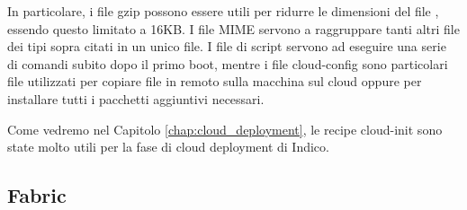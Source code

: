             In particolare, i file gzip possono essere utili per ridurre le dimensioni del file , essendo questo limitato a 16KB. I file MIME servono a raggruppare tanti altri file dei tipi sopra citati in un unico file. I file di script servono ad eseguire una serie di comandi subito dopo il primo boot, mentre i file cloud-config sono particolari file utilizzati per copiare file in remoto sulla macchina sul cloud oppure per installare tutti i pacchetti aggiuntivi necessari.
            
            Come vedremo nel Capitolo \ref{chap:cloud_deployment}, le recipe cloud-init sono state molto utili per la fase di cloud deployment di Indico.
                    
        \subsection{Fabric} \label{subsec:p;sl;fabric}
